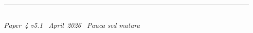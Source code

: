 \documentclass[11pt]{article}
\begin{document}
\enlargethispage{3\baselineskip}
\vspace*{\fill}
\begin{minipage}{\linewidth}
\rule{\linewidth}{0.4pt}\smallskip\\
\small\emph{Paper~4 v5.1 \textperiodcentered\ April~2026
\textperiodcentered\ Pauca sed matura}
\end{minipage}
\end{document}
